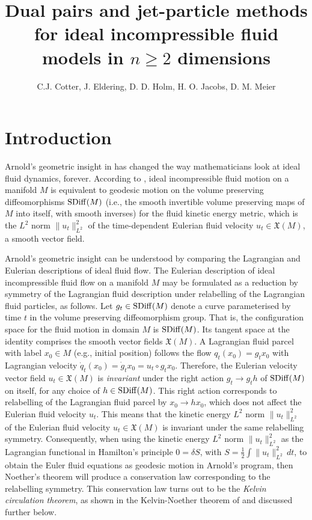 \documentclass[12pt]{amsart}
\title[Dual pairs and jet-particle methods for fluid models]%
{Dual pairs and jet-particle methods for ideal incompressible fluid models in $n \geq 2$ dimensions}
\author{C.J. Cotter, J. Eldering, D. D. Holm, H. O. Jacobs, D. M. Meier}
\begin{document}
\maketitle

\begin{abstract}
\end{abstract}

\tableofcontents

\section{Introduction}

Arnold's geometric insight in \cite{Arnold1966}  has changed the way mathematicians look at ideal fluid dynamics, forever.  According to \cite{Arnold1966}, ideal incompressible fluid motion on a manifold $M$  is equivalent to geodesic motion on the volume preserving diffeomorphisms ${\rm SDiff}(M)$ (i.e., the smooth invertible volume preserving maps of $M$ into itself, with smooth inverses) for the fluid kinetic energy metric, which is the $L^2$ norm $\|u_t\|_{L^2}^2$ of the time-dependent Eulerian fluid velocity $u_t\in \mathfrak{X}(M)$, a smooth vector field.

Arnold's geometric insight can be understood by comparing the Lagrangian and Eulerian descriptions of ideal fluid flow. The Eulerian description of ideal incompressible fluid flow on a manifold $M$ may be formulated as a reduction by symmetry of the Lagrangian fluid description under relabelling of the Lagrangian fluid particles, as follows. Let $g_t\in{\rm SDiff}(M)$ denote a curve parameterised by time $t$ in the volume preserving diffeomorphism group. That is, the configuration space for the fluid motion in domain $M$ is ${\rm SDiff}(M)$. Its tangent space at the identity comprises the smooth vector fields $\mathfrak{X}(M)$. A Lagrangian fluid parcel with label $x_0\in M$ (e.g., initial position) follows the flow $q_t(x_0)=g_t x_0$ with Lagrangian velocity $\dot{q}_t(x_0)=\dot{g}_t x_0=u_t\circ g_t x_0 $. Therefore, the Eulerian velocity vector field $u_t\in \mathfrak{X}(M)$ is \emph{invariant} under the right action $g_t \to g_t h$ of ${\rm SDiff}(M)$ on itself, for any choice of $h\in{\rm SDiff}(M)$. This right action corresponds to relabelling of the Lagrangian fluid parcel by $x_0\to hx_0$, which does not affect the Eulerian fluid velocity $u_t$. This means that the kinetic energy $L^2$ norm $\|u_t\|_{L^2}^2$ of the Eulerian fluid velocity $u_t\in \mathfrak{X}(M)$ is invariant under the same relabelling symmetry. Consequently, when using the kinetic energy $L^2$ norm $\|u_t\|_{L^2}^2$ as the Lagrangian functional in Hamilton's principle $0=\delta S$, with $S=\frac12\int \|u_t\|_{L^2}^2\,dt$, to obtain the Euler fluid equations as geodesic motion in Arnold's program, then Noether's theorem will produce a conservation law corresponding to the relabelling symmetry. This conservation law turns out to be the \emph{Kelvin circulation theorem}, as shown in the Kelvin-Noether theorem of \cite{HolmMarsdenRatiu1998} and discussed further below. 
\end{document}
